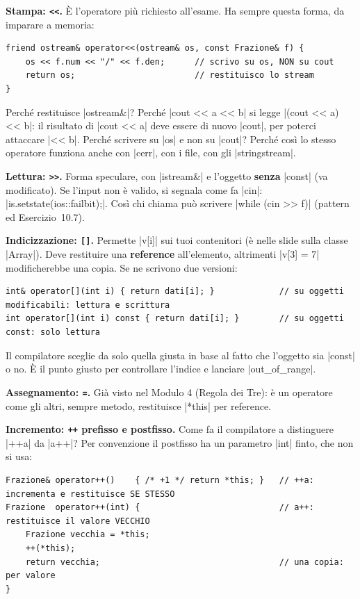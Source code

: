\textbf{Stampa: \texttt{<<}.} È l'operatore più richiesto all'esame. Ha sempre questa
forma, da imparare a memoria:
\begin{lstlisting}
friend ostream& operator<<(ostream& os, const Frazione& f) {
    os << f.num << "/" << f.den;      // scrivo su os, NON su cout
    return os;                        // restituisco lo stream
}
\end{lstlisting}
Perché restituisce \cc|ostream&|? Perché \cc|cout << a << b| si legge
\cc|(cout << a) << b|: il risultato di \cc|cout << a| deve essere di nuovo \cc|cout|,
per poterci attaccare \cc|<< b|. Perché scrivere su \cc|os| e non su \cc|cout|? Perché
così lo stesso operatore funziona anche con \cc|cerr|, con i file, con gli
\cc|stringstream|.

\textbf{Lettura: \texttt{>>}.} Forma speculare, con \cc|istream&| e l'oggetto
\textbf{senza} \cc|const| (va modificato). Se l'input non è valido, si segnala come fa
\cc|cin|: \cc|is.setstate(ios::failbit);|. Così chi chiama può scrivere
\cc|while (cin >> f)| (pattern ed Esercizio~10.7).

\textbf{Indicizzazione: \texttt{[]}.} Permette \cc|v[i]| sui tuoi contenitori (è nelle
slide sulla classe \cc|Array|). Deve restituire una \textbf{reference} all'elemento,
altrimenti \cc|v[3] = 7| modificherebbe una copia. Se ne scrivono due versioni:
\begin{lstlisting}
int& operator[](int i) { return dati[i]; }             // su oggetti modificabili: lettura e scrittura
int operator[](int i) const { return dati[i]; }        // su oggetti const: solo lettura
\end{lstlisting}
Il compilatore sceglie da solo quella giusta in base al fatto che l'oggetto sia
\cc|const| o no. È il punto giusto per controllare l'indice e lanciare
\cc|out_of_range|.

\textbf{Assegnamento: \texttt{=}.} Già visto nel Modulo 4 (Regola dei Tre): è un
operatore come gli altri, sempre metodo, restituisce \cc|*this| per reference.

\textbf{Incremento: \texttt{++} prefisso e postfisso.} Come fa il compilatore a
distinguere \cc|++a| da \cc|a++|? Per convenzione il postfisso ha un parametro
\cc|int| finto, che non si usa:
\begin{lstlisting}
Frazione& operator++()    { /* +1 */ return *this; }   // ++a: incrementa e restituisce SE STESSO
Frazione  operator++(int) {                            // a++: restituisce il valore VECCHIO
    Frazione vecchia = *this;
    ++(*this);
    return vecchia;                                    // una copia: per valore
}
\end{lstlisting}

